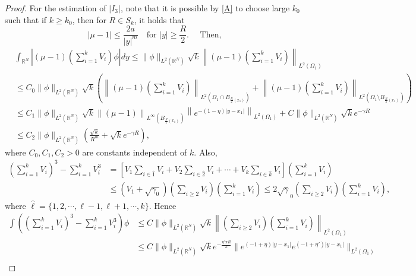 \documentclass{amsart}
\theoremstyle{definition}
\theoremstyle{remark}
\numberwithin{equation}{section}
\begin{document}
\begin{proof}
For the estimation of $|I_3|$, note that it is possible by \eqref{A} to choose large $k_0$ such that if $k\ge k_0$, then for $R \in S_k$, it holds that
$$ |\mu - 1| \le \frac{2a}{|y|^m} \quad \text{for $|y|\ge \frac{R}{2}$. } \quad \text{Then,}$$
\begin{equation} \label{mu-1}
\begin{aligned}
 &\int_{\mathbb{R}^N} \left|(\mu-1)\left(\sum_{i=1}^k V_{i}\right)\phi\right| dy \le \|\phi\|_{L^2(\mathbb{R}^N)} \sqrt{k}\left\| (\mu -1)\left(\sum_{i=1}^k V_{i}\right)\right\|_{L^2(\Omega_1)}\\
 &\le C_0\|\phi\|_{L^2(\mathbb{R}^N)} \sqrt{k}\left(\left\| (\mu -1)\left(\sum_{i=1}^k V_{i}\right)\right\|_{L^2(\Omega_1 \cap B_{\frac{R}{2}(x_1)})} +  \left\| (\mu -1)\left(\sum_{i=1}^k V_{i}\right)\right\|_{L^2(\Omega_1 \setminus  B_{\frac{R}{2}(x_1)})}\right)\\
 &\le C_1\|\phi\|_{L^2(\mathbb{R}^N)} \sqrt{k} \left\| (\mu -1)\right\|_{L^\infty( B_{\frac{R}{2}(x_1)} )} \left\|e^{-(1-\eta)|y-x_1|}\right\|_{L^2(\Omega_1)} + C\|\phi\|_{L^2(\mathbb{R}^N)} \sqrt{k} e^{-\gamma R}\\
 &\le C_2\|\phi\|_{L^2(\mathbb{R}^N)} \left( \frac{\sqrt{k}}{R^m} + \sqrt{k}e^{-\gamma R}\right),
\end{aligned}
\end{equation}where $C_0, C_1, C_2>0$ are constants independent of $k$.  Also,  
\begin{align*}
 \left(\sum_{i=1}^k V_{i}\right)^3 - \sum_{i=1}^k V_{i}^3 &= \left[ V_{1} \sum_{i\in \hat{1}} V_{i} + V_2 \sum_{i\in \hat{2}} V_{i} + \cdots + V_k \sum_{i\in \hat{k}} V_{i} \right] \left(\sum_{i=1}^k V_{i}\right) \\
 & \le (V_{1} + \sqrt{\gamma_0}) \left(\sum_{i\ge 2} V_{i}\right)\left(\sum_{i=1}^k V_{i}\right) \le 2\sqrt\gamma_0\left(\sum_{i\ge 2} V_{i}\right)\left(\sum_{i=1}^k V_{i}\right),\end{align*}
 where $\hat{\ell} = \{1,2,\cdots,\ell-1,\ell+1,\cdots,k\}$. Hence  
 \begin{equation}\begin{aligned}\label{sumdiff}
  \int \left(\left(\sum_{i=1}^k V_{i}\right)^3 - \sum_{i=1}^k V_{i}^3 \right)\phi &\le C\|\phi\|_{L^2(\mathbb{R}^N)} \sqrt{k}\left\|\left(\sum_{i\ge 2} V_{i}\right)\left(\sum_{i=1}^k V_{i}\right) \right\|_{L^2(\Omega_1)} \\
 &\le C\|\phi\|_{L^2(\mathbb{R}^N)}\sqrt{k} e^{-\frac{\eta'\pi R}{k}}\| e^{(-1+\eta)|y-x_1|}e^{(-1+\eta')|y-x_1|}\|_{L^2(\Omega_1)}\\

\end{aligned}
\end{equation}
\end{proof}
\end{document}
